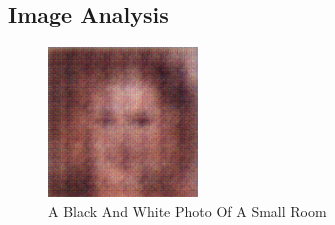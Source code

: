 \documentclass{article}%
\begin{document}
%
\subsection{Image Analysis}%
\label{subsec:ImageAnalysis}%


\begin{figure}[h!]%
\centering%
\includegraphics[width=150px]{500_fake_images/samples_5_179.png}%
\caption{A Black And White Photo Of A Small Room}%
\end{figure}

%
\end{document}
